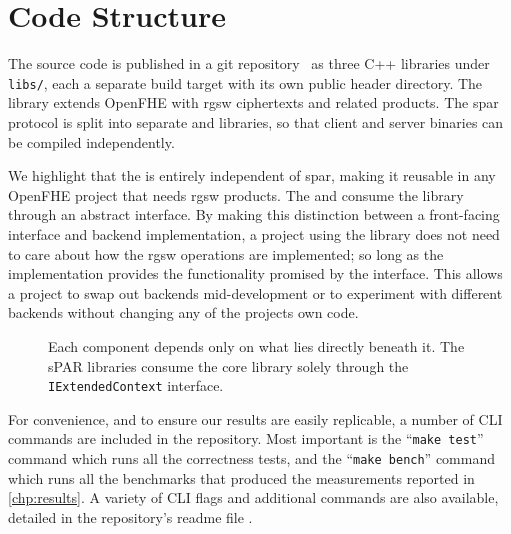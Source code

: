 
\section{Code Structure}
\label{sec:impl:structure}
The source code is published in a git repository~\cite{gitrepo} as three C++ libraries under \texttt{libs/}, each a separate build target with its own public header directory. The \corelib{} library extends OpenFHE with \gls{rgsw} ciphertexts and related products. The \gls{spar} protocol is split into separate \clientlib{} and \serverlib{} libraries, so that client and server binaries can be compiled independently.

We highlight that the \corelib{} is entirely independent of \gls{spar}, making it reusable in any OpenFHE project that needs \gls{rgsw} products. The \clientlib{} and \serverlib{} consume the \corelib{} library through an abstract interface. By making this distinction between a front-facing interface and backend implementation, a project using the \corelib{} library does not need to care about how the \gls{rgsw} operations are implemented; so long as the implementation provides the functionality promised by the interface. This allows a project to swap out backends mid-development or to experiment with different backends without changing any of the projects own code.

\begin{figure}[!htb]
    \centering
    
    \caption{Each component depends only on what lies directly beneath it. The sPAR libraries consume the core library solely through the \texttt{IExtendedContext} interface.}
    \label{fig:lib-structure}
\end{figure}

For convenience, and to ensure our results are easily replicable, a number of CLI commands are included in the repository. Most important is the ``\texttt{make test}'' command which runs all the correctness tests, and the ``\texttt{make bench}'' command which runs all the benchmarks that produced the measurements reported in \autoref{chp:results}. A variety of CLI flags and additional commands are also available, detailed in the repository's readme file \cite{gitrepo}.
